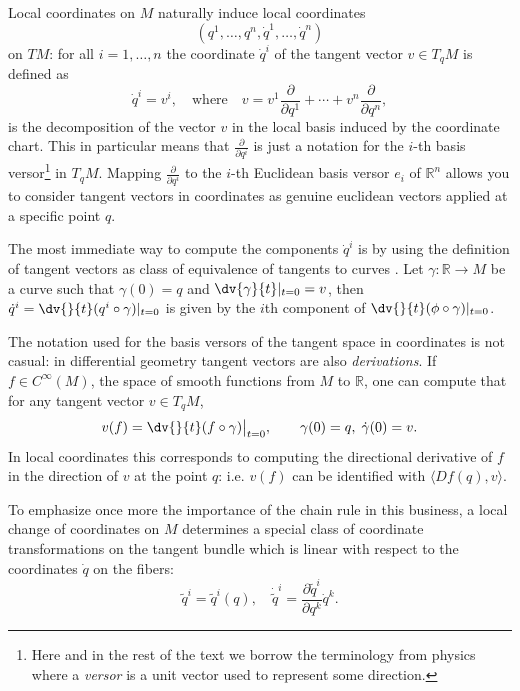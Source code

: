 \documentclass[english,fontsize=11pt,paper=b5]{scrbook}
\numberwithin{equation}{chapter}
\theoremstyle{definition}
\begin{document}
    Local coordinates on $M$ naturally induce local coordinates \[(q^1,\ldots,q^n,\dot q^1, \ldots,\dot q^n)\] on $TM$: for all $i=1,\ldots,n$ the coordinate $\dot q^i$ of the tangent vector $v\in T_qM$ is defined as
    \begin{equation}
      \dot q^i = v^i,\quad\mbox{where}\quad v = v^1\frac{\partial}{\partial q^1}+\cdots+v^n \frac{\partial}{\partial q^n},
    \end{equation}
    is the decomposition of the vector $v$ in the local basis induced by the coordinate chart.
    This in particular means that $\frac{\partial}{\partial q^i}$ is just a notation for the $i$-th basis versor\footnote{Here and in the rest of the text we borrow the terminology from physics where a \emph{versor} is a unit vector used to represent some direction.} in $T_q M$.
    Mapping $\frac{\partial}{\partial q^i}$ to the $i$-th Euclidean basis versor $e_i$ of $\mathbb{R}^n$ allows you to consider tangent vectors in coordinates as genuine euclidean vectors applied at a specific point $q$.

    The most immediate way to compute the components $\dot q^i$ is by using the definition of tangent vectors as class of equivalence of tangents to curves \cite[Chapter 2.5]{lectures:aom:seri}.
    Let $\gamma:\mathbb{R} \to M$ be a curve such that $\gamma(0) = q$ and $\dv{\gamma}{t}|_{t=0} = v$, then $\dot q^i = \dv{}{t}(q^i\circ\gamma)|_{t=0}$ is given by the $i$th component of $\dv{}{t}(\phi\circ\gamma)|_{t=0}$.

    The notation used for the basis versors of the tangent space in coordinates is not casual: in differential geometry tangent vectors are also \emph{derivations}. If $f\in C^\infty(M)$, the space of smooth functions from $M$ to $\mathbb{R}$, one can compute that for any tangent vector $v\in T_qM$,
    \begin{equation}
      v(f)=\dv{}{t}(f\circ\gamma)\big|_{t=0}, \qquad \gamma(0) = q, \; \dot \gamma(0) = v.
    \end{equation}
    In local coordinates this corresponds to computing the directional derivative of $f$ in the direction of $v$ at the point $q$: i.e. $v(f)$ can be identified with $\langle Df(q),v\rangle$.

    To emphasize once more the importance of the chain rule in this business, a local change of coordinates on $M$ determines a special class of coordinate transformations on the tangent bundle which is linear with respect to the coordinates $\dot q$ on the fibers:
    \begin{equation}
      \widetilde q^i = \widetilde q^i (q), \quad \dot{\widetilde q}^i = \frac{\partial\widetilde q^i}{\partial q^k}\dot q^k.
    \end{equation}
\end{document}
